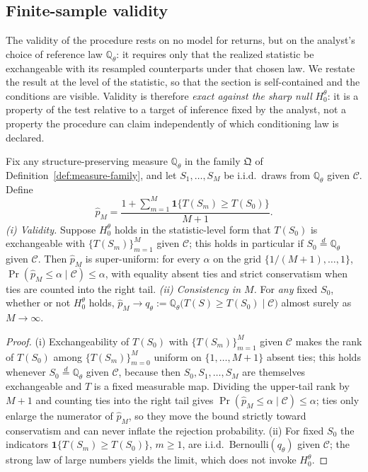 \documentclass[risks,article,submit,pdftex,oneauthor]{Definitions/mdpi}
\begin{document}
\subsection{Finite-sample validity}
\label{sec:fs-validity}

The validity of the procedure rests on no model for returns, but on the
analyst's choice of reference law $\mathbb{Q}_\theta$: it requires only that the
realized statistic be exchangeable with its resampled counterparts under that
chosen law. We restate the result at the level of the statistic, so that the
section is self-contained and the conditions are visible. Validity is therefore
\emph{exact against the sharp null} $H_0^\theta$: it is a property of the test
relative to a target of inference fixed by the analyst, not a property the
procedure can claim independently of which conditioning law is declared.

\begin{Theorem}
\label{prop:q-validity}
Fix any structure-preserving measure $\mathbb{Q}_\theta$ in the family
$\mathfrak Q$ of Definition~\ref{def:measure-family}, and let $S_1,\dots,S_M$ be
i.i.d.\ draws from $\mathbb{Q}_\theta$ given $\mathcal C$.
Define
\[
\hat p_M
=\frac{1+\sum_{m=1}^{M}\mathbf 1\{T(S_m)\ge T(S_0)\}}{M+1}.
\]
\emph{(i) Validity.} Suppose $H_0^\theta$ holds in the statistic-level form that
$T(S_0)$ is exchangeable with $\{T(S_m)\}_{m=1}^{M}$ given $\mathcal C$; this
holds in particular if $S_0\stackrel{d}{=}\mathbb{Q}_\theta$ given $\mathcal C$.
Then $\hat p_M$ is super-uniform: for every $\alpha$ on the grid
$\{1/(M+1),\dots,1\}$, $\Pr(\hat p_M\le\alpha\mid\mathcal C)\le\alpha$, with
equality absent ties and strict conservatism when ties are counted into the
right tail.
\emph{(ii) Consistency in $M$.} For \emph{any} fixed $S_0$, whether or not
$H_0^\theta$ holds, $\hat p_M\to q_\theta:=\mathbb{Q}_\theta\big(T(S)\ge
T(S_0)\mid\mathcal C\big)$ almost surely as $M\to\infty$.
\end{Theorem}

\begin{proof}
(i) Exchangeability of $T(S_0)$ with $\{T(S_m)\}_{m=1}^{M}$ given $\mathcal C$
makes the rank of $T(S_0)$ among $\{T(S_m)\}_{m=0}^{M}$ uniform on
$\{1,\dots,M+1\}$ absent ties; this holds whenever $S_0\stackrel{d}{=}
\mathbb{Q}_\theta$ given $\mathcal C$, because then $S_0,S_1,\dots,S_M$ are
themselves exchangeable and $T$ is a fixed measurable map. Dividing the
upper-tail rank by $M+1$ and counting ties into the right tail gives
$\Pr(\hat p_M\le\alpha\mid\mathcal C)\le\alpha$; ties only enlarge the numerator
of $\hat p_M$, so they move the bound strictly toward conservatism and can never
inflate the rejection probability. (ii) For fixed $S_0$ the indicators
$\mathbf 1\{T(S_m)\ge T(S_0)\}$, $m\ge1$, are i.i.d.\ Bernoulli$(q_\theta)$
given $\mathcal C$; the strong law of large numbers yields the limit, which does
not invoke $H_0^\theta$.
\end{proof}
\end{document}
